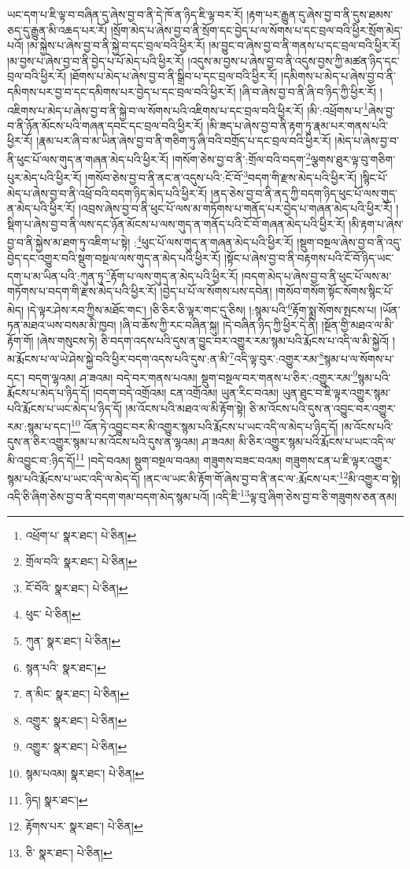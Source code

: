 ཡང་དག་པ་ཇི་ལྟ་བ་བཞིན་དུ་ཞེས་བྱ་བ་ནི་དེ་ཁོ་ན་ཉིད་ཇི་ལྟ་བར་རོ། །རྟག་པར་རྒྱུན་དུ་ཞེས་བྱ་བ་ནི་དུས་ཐམས་ཅད་དུ་རྒྱུན་མི་འཆད་པར་རོ། །སྲོག་མེད་པ་ཞེས་བྱ་བ་ནི་སྲོག་དང་བྱེད་པ་ལ་སོགས་པ་དང་བྲལ་བའི་ཕྱིར་སྲོག་མེད་པའོ། །མ་སྐྱེས་པ་ཞེས་བྱ་བ་ནི་སྐྱེ་བ་དང་བྲལ་བའི་ཕྱིར་རོ། །མ་བྱུང་བ་ཞེས་བྱ་བ་ནི་གནས་པ་དང་བྲལ་བའི་ཕྱིར་རོ། །མ་བྱས་པ་ཞེས་བྱ་བ་ནི་བྱེད་པ་པོ་མེད་པའི་ཕྱིར་རོ། །འདུས་མ་བྱས་པ་ཞེས་བྱ་བ་ནི་འདུས་བྱས་ཀྱི་མཚན་ཉིད་དང་བྲལ་བའི་ཕྱིར་རོ། །ཐོགས་པ་མེད་པ་ཞེས་བྱ་བ་ནི་སྒྲིབ་པ་དང་བྲལ་བའི་ཕྱིར་རོ། །དམིགས་པ་མེད་པ་ཞེས་བྱ་བ་ནི་དམིགས་པར་བྱ་བ་དང་དམིགས་པར་བྱེད་པ་དང་བྲལ་བའི་ཕྱིར་རོ། །ཞི་བ་ཞེས་བྱ་བ་ནི་ཞི་བ་ཉིད་ཀྱི་ཕྱིར་རོ། །འཇིགས་པ་མེད་པ་ཞེས་བྱ་བ་ནི་སྐྱེ་བ་ལ་སོགས་པའི་འཇིགས་པ་དང་བྲལ་བའི་ཕྱིར་རོ། །མི་:འཕྲོགས་པ་\footnote{འཕྲོག་པ་  སྣར་ཐང་།  པེ་ཅིན། }ཞེས་བྱ་བ་ནི་ཉོན་མོངས་པའི་གཞན་དབང་དང་བྲལ་བའི་ཕྱིར་རོ། །མི་ཟད་པ་ཞེས་བྱ་བ་ནི་རྟག་ཏུ་རྣམ་པར་གནས་པའི་ཕྱིར་རོ། །རྣམ་པར་ཞི་བ་མ་ཡིན་ཞེས་བྱ་བ་ནི་གཅིག་ཏུ་ཞི་བའི་བགྲོད་པ་དང་བྲལ་བའི་ཕྱིར་རོ། །མེད་པ་ཞེས་བྱ་བ་ནི་ཕུང་པོ་ལས་གུད་ན་གཞན་མེད་པའི་ཕྱིར་རོ། །གསོག་ཅེས་བྱ་བ་ནི་:གྲོལ་བའི་བདག་\footnote{གྲོལ་བའི་  སྣར་ཐང་།  པེ་ཅིན། }ལྕགས་ཐུར་ལྟ་བུ་གཅིག་པུར་མེད་པའི་ཕྱིར་རོ། །གསོབ་ཅེས་བྱ་བ་ནི་ནང་ན་འདུས་པའི་:ངོ་བོ་\footnote{ངོ་བོའི་  སྣར་ཐང་།  པེ་ཅིན། }བདག་གི་རྫས་མེད་པའི་ཕྱིར་རོ། །སྙིང་པོ་མེད་པ་ཞེས་བྱ་བ་ནི་འཕྲོ་བའི་བདག་ཉིད་མེད་པའི་ཕྱིར་རོ། །ནད་ཅེས་བྱ་བ་ནི་ནད་ཀྱི་བདག་ཉིད་ཕུང་པོ་ལས་གུད་ན་མེད་པའི་ཕྱིར་རོ། །འབྲས་ཞེས་བྱ་བ་ནི་ཕུང་པོ་ལས་མ་གཏོགས་པ་གནོད་པར་བྱེད་པ་གཞན་མེད་པའི་ཕྱིར་རོ། །སྡིག་པ་ཞེས་བྱ་བ་ནི་ལས་དང་ཉོན་མོངས་པ་ལས་གུད་ན་གནོད་པའི་ངོ་བོ་གཞན་མེད་པའི་ཕྱིར་རོ། །མི་རྟག་པ་ཞེས་བྱ་བ་ནི་སྐྱེས་མ་ཐག་ཏུ་འཇིག་པ་སྟེ། :\footnote{ཕུང་  པེ་ཅིན། }ཕུང་པོ་ལས་གུད་ན་གཞན་མེད་པའི་ཕྱིར་རོ། །སྡུག་བསྔལ་ཞེས་བྱ་བ་ནི་འདུ་བྱེད་དང་འགྱུར་བའི་སྡུག་བསྔལ་ལས་གུད་ན་མེད་པའི་ཕྱིར་རོ། །སྟོང་པ་ཞེས་བྱ་བ་ནི་བརྟགས་པའི་ངོ་བོ་ཉིད་ཡང་དག་པ་མ་ཡིན་པའི་:ཀུན་ཏུ་\footnote{ཀུན་  སྣར་ཐང་།  པེ་ཅིན། }རྟོག་པ་ལས་གུད་ན་མེད་པའི་ཕྱིར་རོ། །བདག་མེད་པ་ཞེས་བྱ་བ་ནི་ཕུང་པོ་ལས་མ་གཏོགས་པ་བདག་གི་རྫས་མེད་པའི་ཕྱིར་རོ། །བྱེད་པ་པོ་ལ་སོགས་པས་དབེན། །གསོབ་གསོག་སྟོང་སོགས་སྙིང་པོ་མེད། །དེ་ལྟར་ཤེས་རབ་ཀྱིས་མཐོང་གང་། །ཅི་ཅིར་ཅི་ལྟར་གང་དུ་ཅིས། །:སྙམ་པའི་\footnote{སྙན་པའི་  སྣར་ཐང་། }རྟོག་སྨྲ་སོགས་སྤངས་པ། །ཡོན་ཏན་མཐའ་ཡས་བསམ་མི་ཁྱབ། །ཞི་བ་ཆོས་ཀྱི་རང་བཞིན་སྐུ། །དེ་བཞིན་ཉིད་ཀྱི་ཕྱིར་དེ་ནི། །སྔོན་གྱི་མཐའ་ལ་མི་རྟོག་གོ། །ཞེས་གསུངས་ཏེ། ཅི་བདག་འདས་པའི་དུས་ན་བྱུང་བར་འགྱུར་རམ་སྙམ་པའི་རྨོངས་པ་འདི་ལ་མི་སྐྱེའོ། །མ་རྨོངས་པ་ལ་ཡེ་ཤེས་སྐྱེ་བའི་ཕྱིར་བདག་འདས་པའི་དུས་:ན་མི་\footnote{ན་མིང་  སྣར་ཐང་།  པེ་ཅིན། }འདི་ལྟ་བུར་:འགྱུར་རམ་\footnote{འགྱུར་  སྣར་ཐང་།  པེ་ཅིན། }སྙམ་པ་ལ་སོགས་པ་དང་། བདག་ལྷའམ། ཤ་ཟའམ། བདེ་བར་གནས་པའམ། སྡུག་བསྔལ་བར་གནས་པ་ཅིར་:འགྱུར་རམ་\footnote{འགྱུར་  སྣར་ཐང་།  པེ་ཅིན། }སྙམ་པའི་རྨོངས་པ་མེད་པ་ཉིད་དོ། །བདག་བདེ་འགྲོའམ། ངན་འགྲོའམ། ཡུན་རིང་བའམ། ཡུན་ཐུང་བ་ཇི་ལྟར་འགྱུར་སྙམ་པའི་རྨོངས་པ་ཡང་མེད་པ་ཉིད་དོ། །མ་འོངས་པའི་མཐའ་ལ་མི་རྟོག་སྟེ། ཅི་མ་འོངས་པའི་དུས་ན་འབྱུང་བར་འགྱུར་རམ་:སྙམ་པ་དང་།\footnote{སྙམ་པའམ།  སྣར་ཐང་།  པེ་ཅིན། } འོན་ཏེ་འབྱུང་བར་མི་འགྱུར་སྙམ་པའི་རྨོངས་པ་ཡང་འདི་ལ་མེད་པ་ཉིད་དོ། །མ་འོངས་པའི་དུས་ན་ཅིར་འགྱུར་སྙམ་པ་མ་འོངས་པའི་དུས་ན་ལྷའམ། ཤ་ཟའམ། མི་ཅིར་འགྱུར་སྙམ་པའི་རྨོངས་པ་ཡང་འདི་ལ་མི་འབྱུང་བ་:ཉིད་དོ།\footnote{ཉིད།  སྣར་ཐང་། } །བདེ་བའམ། སྡུག་བསྔལ་བའམ། གཟུགས་བཟང་བའམ། གཟུགས་ངན་པ་ཇི་ལྟར་འགྱུར་སྙམ་པའི་རྨོངས་པ་ཡང་འདི་ལ་མེད་དོ། །ནང་ལ་ཡང་མི་རྟོག་གོ་ཞེས་བྱ་བ་ནི་ནང་ལ་:རྨོངས་པར་\footnote{རྟོགས་པར་  སྣར་ཐང་།  པེ་ཅིན། }མི་འགྱུར་བ་སྟེ། འདི་ཅི་ཞིག་ཅེས་བྱ་བ་ནི་བདག་གམ་བདག་མེད་སྙམ་པའོ། །འདི་ཇི་\footnote{ཅི་  སྣར་ཐང་།  པེ་ཅིན། }ལྟ་བུ་ཞིག་ཅེས་བྱ་བ་ཅི་གཟུགས་ཅན་ནམ། 